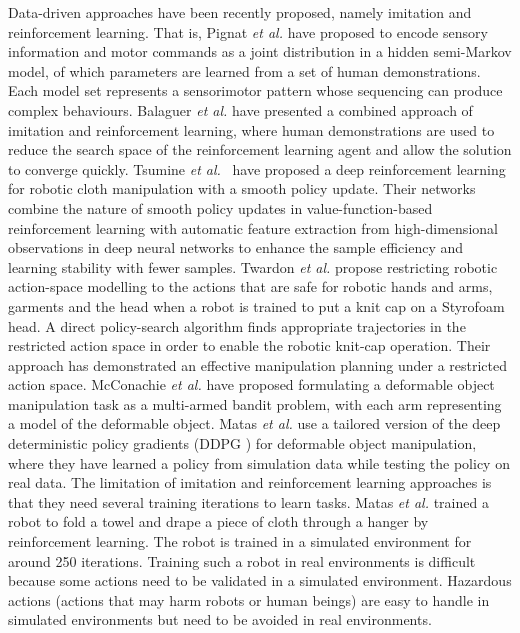 \documentclass[conference]{IEEEtran}
\begin{document}
Data-driven approaches have been recently proposed, namely imitation and reinforcement learning. That is, Pignat \textit{et al.} \cite{pignat2017learning} have proposed to encode sensory information and motor commands as a joint distribution in a hidden semi-Markov model, of which parameters are learned from a set of human demonstrations. Each model set represents a sensorimotor pattern whose sequencing can produce complex behaviours. Balaguer \textit{et al.} \cite{balaguer2011combining} have presented a combined approach of imitation and reinforcement learning, where human demonstrations are used to reduce the search space of the reinforcement learning agent and allow the solution to converge quickly. Tsumine \textit{et al.}~\cite{tsurumine2019deep} have proposed a deep reinforcement learning for robotic cloth manipulation with a smooth policy update. Their networks combine the nature of smooth policy updates in value-function-based reinforcement learning with automatic feature extraction from high-dimensional observations in deep neural networks to enhance the sample efficiency and learning stability with fewer samples. Twardon \textit{et al.} propose restricting robotic action-space modelling to the actions that are safe for robotic hands and arms, garments and the head when a robot is trained to put a knit cap on a Styrofoam head. A direct policy-search algorithm finds appropriate trajectories in the restricted action space in order to enable the robotic knit-cap operation. Their approach has demonstrated an effective manipulation planning under a restricted action space. McConachie \textit{et al.} \cite{mcconachie2018estimating} have proposed formulating a deformable object manipulation task as a multi-armed bandit problem, with each arm representing a model of the deformable object. Matas \textit{et al.} \cite{matas2018sim} use a tailored version of the deep deterministic policy gradients (DDPG \cite{lillicrap2015continuous}) for deformable object manipulation, where they have learned a policy from simulation data while testing the policy on real data. The limitation of imitation and reinforcement learning approaches is that they need several training iterations to learn tasks. Matas \textit{et al.} \cite{matas2018sim} trained a robot to fold a towel and drape a piece of cloth through a hanger by reinforcement learning. The robot is trained in a simulated environment for around 250 iterations. Training such a robot in real environments is difficult because some actions need to be validated in a simulated environment. Hazardous actions (actions that may harm robots or human beings) are easy to handle in simulated environments but need to be avoided in real environments.
\end{document}
